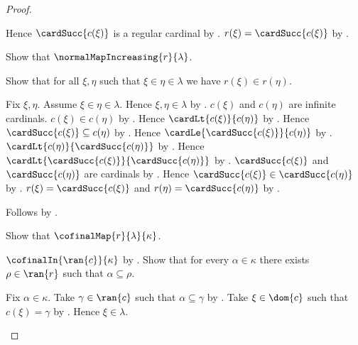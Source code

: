 \begin{proof}
\begin{subproof}
        Hence $\cardSucc{c(\xi)}$ is a regular cardinal by
            .
        $r(\xi)=\cardSucc{c(\xi)}$ by
            .
    \end{subproof}
    Show that $\normalMapIncreasing{r}{\lambda}$.
    \begin{subproof}
        Show that for all $\xi,\eta$ such that
            $\xi\in\eta\in\lambda$ we have $r(\xi)\in r(\eta)$.
        \begin{subproof}
            Fix $\xi,\eta$.
            Assume $\xi\in\eta\in\lambda$.
            Hence $\xi,\eta\in\lambda$ by
                .
            $c(\xi)$ and $c(\eta)$ are infinite cardinals.
            $c(\xi)\in c(\eta)$ by
                .
            Hence $\cardLt{c(\xi)}{c(\eta)}$ by
                .
            Hence $\cardSucc{c(\xi)}\subseteq c(\eta)$ by
                .
            Hence $\cardLe{\cardSucc{c(\xi)}}{c(\eta)}$ by
                .
            $\cardLt{c(\eta)}{\cardSucc{c(\eta)}}$ by
                .
            Hence $\cardLt{\cardSucc{c(\xi)}}
                {\cardSucc{c(\eta)}}$ by
                .
            $\cardSucc{c(\xi)}$ and $\cardSucc{c(\eta)}$ are cardinals by
                .
            Hence $\cardSucc{c(\xi)}\in\cardSucc{c(\eta)}$ by
                .
            $r(\xi)=\cardSucc{c(\xi)}$ and
                $r(\eta)=\cardSucc{c(\eta)}$ by
                .
        \end{subproof}
        Follows by .
    \end{subproof}
    Show that $\cofinalMap{r}{\lambda}{\kappa}$.
    \begin{subproof}
        $\cofinalIn{\ran{c}}{\kappa}$ by .
        Show that for every $\alpha\in\kappa$ there exists
            $\rho\in\ran{r}$ such that $\alpha\subseteq\rho$.
        \begin{subproof}
            Fix $\alpha\in\kappa$.
            Take $\gamma\in\ran{c}$ such that $\alpha\subseteq\gamma$ by
                .
            Take $\xi\in\dom{c}$ such that $c(\xi)=\gamma$ by
                .
            Hence $\xi\in\lambda$.

\end{subproof}
\end{subproof}
\end{proof}
